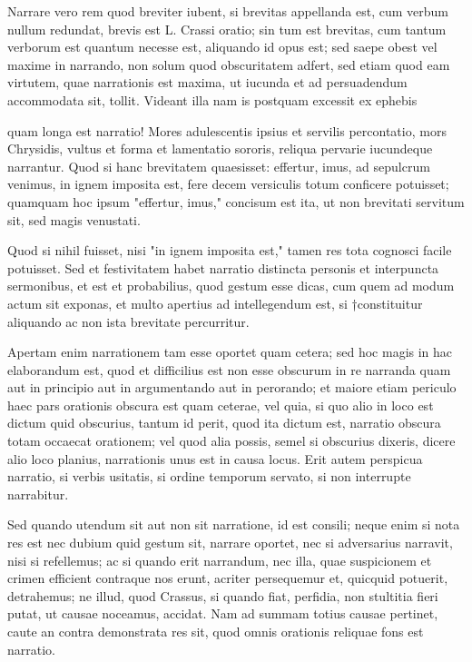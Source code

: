  Narrare vero rem quod breviter iubent, si brevitas appellanda est, cum verbum nullum redundat, brevis est L. Crassi oratio; sin tum est brevitas, cum tantum verborum est quantum necesse est, aliquando id opus est; sed saepe obest vel maxime in narrando, non solum quod obscuritatem adfert, sed etiam quod eam virtutem, quae narrationis est maxima, ut iucunda et ad persuadendum accommodata sit, tollit. Videant illa nam is postquam excessit ex ephebis

 quam longa est narratio! Mores adulescentis ipsius et servilis percontatio, mors Chrysidis, vultus et forma et lamentatio sororis, reliqua pervarie iucundeque narrantur. Quod si hanc brevitatem quaesisset: effertur, imus, ad sepulcrum venimus, in ignem imposita est, fere decem versiculis totum conficere potuisset; quamquam hoc ipsum "effertur, imus," concisum est ita, ut non brevitati servitum sit, sed magis venustati.

 Quod si nihil fuisset, nisi "in ignem imposita est," tamen res tota cognosci facile potuisset. Sed et festivitatem habet narratio distincta personis et interpuncta sermonibus, et est et probabilius, quod gestum esse dicas, cum quem ad modum actum sit exponas, et multo apertius ad intellegendum est, si †constituitur aliquando ac non ista brevitate percurritur.

 Apertam enim narrationem tam esse oportet quam cetera; sed hoc magis in hac elaborandum est, quod et difficilius est non esse obscurum in re narranda quam aut in principio aut in argumentando aut in perorando; et maiore etiam periculo haec pars orationis obscura est quam ceterae, vel quia, si quo alio in loco est dictum quid obscurius, tantum id perit, quod ita dictum est, narratio obscura totam occaecat orationem; vel quod alia possis, semel si obscurius dixeris, dicere alio loco planius, narrationis unus est in causa locus. Erit autem perspicua narratio, si verbis usitatis, si ordine temporum servato, si non interrupte narrabitur.

 Sed quando utendum sit aut non sit narratione, id est consili; neque enim si nota res est nec dubium quid gestum sit, narrare oportet, nec si adversarius narravit, nisi si refellemus; ac si quando erit narrandum, nec illa, quae suspicionem et crimen efficient contraque nos erunt, acriter persequemur et, quicquid potuerit, detrahemus; ne illud, quod Crassus, si quando fiat, perfidia, non stultitia fieri putat, ut causae noceamus, accidat. Nam ad summam totius causae pertinet, caute an contra demonstrata res sit, quod omnis orationis reliquae fons est narratio.


